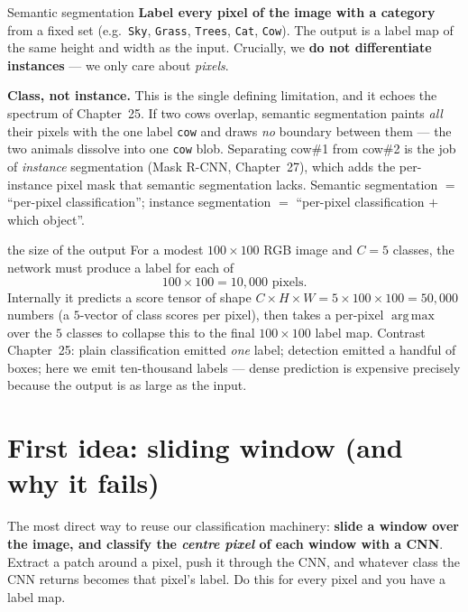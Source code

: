 \documentclass{report}
\DeclareMathOperator*{\argmax}{arg\,max}
\begin{document}
\begin{defbox}{Semantic segmentation}
\textbf{Label every pixel of the image with a category} from a fixed set
(e.g.\ \texttt{Sky}, \texttt{Grass}, \texttt{Trees}, \texttt{Cat},
\texttt{Cow}). The output is a label map of the same height and width as the
input. Crucially, we \textbf{do not differentiate instances} --- we only care
about \emph{pixels}.
\end{defbox}

\begin{keybox}
\textbf{Class, not instance.} This is the single defining limitation, and it
echoes the spectrum of Chapter~25. If two cows overlap, semantic segmentation
paints \emph{all} their pixels with the one label \texttt{cow} and draws
\emph{no} boundary between them --- the two animals dissolve into one
\texttt{cow} blob. Separating cow\#1 from cow\#2 is the job of \emph{instance}
segmentation (Mask R-CNN, Chapter~27), which adds the per-instance pixel mask
that semantic segmentation lacks. Semantic segmentation $=$ ``per-pixel
classification''; instance segmentation $=$ ``per-pixel classification $+$
which object''.
\end{keybox}

\begin{exbox}{the size of the output}
For a modest $100\times100$ RGB image and $C=5$ classes, the network must
produce a label for each of
\[
100\times 100 = 10{,}000 \text{ pixels.}
\]
Internally it predicts a score tensor of shape $C\times H\times W =
5\times100\times100 = 50{,}000$ numbers (a $5$-vector of class scores per
pixel), then takes a per-pixel $\argmax$ over the $5$ classes to collapse this
to the final $100\times100$ label map. Contrast Chapter~25: plain
classification emitted \emph{one} label; detection emitted a handful of boxes;
here we emit ten-thousand labels --- dense prediction is expensive precisely
because the output is as large as the input.
\end{exbox}

\section{First idea: sliding window (and why it fails)}

The most direct way to reuse our classification machinery: \textbf{slide a
window over the image, and classify the \emph{centre pixel} of each window with
a CNN}. Extract a patch around a pixel, push it through the CNN, and whatever
class the CNN returns becomes that pixel's label. Do this for every pixel and
you have a label map.
\end{document}
